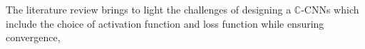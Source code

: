 


The literature review brings to light the challenges of designing a $\mathbb{C}$-CNNs which include the choice of activation function and loss function while ensuring convergence, 





  
